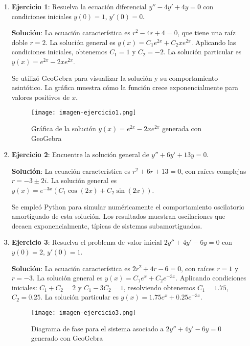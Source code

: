 \documentclass[12pt,a4paper]{article}
\begin{document}
\begin{enumerate}
    \item \textbf{Ejercicio 1}: Resuelva la ecuación diferencial $y'' - 4y' + 4y = 0$ con condiciones iniciales $y(0) = 1$, $y'(0) = 0$.
    
    \textbf{Solución}: La ecuación característica es $r^2 - 4r + 4 = 0$, que tiene una raíz doble $r = 2$. La solución general es $y(x) = C_1 e^{2x} + C_2 x e^{2x}$. Aplicando las condiciones iniciales, obtenemos $C_1 = 1$ y $C_2 = -2$. La solución particular es $y(x) = e^{2x} - 2x e^{2x}$.
    
    Se utilizó GeoGebra para visualizar la solución y su comportamiento asintótico. La gráfica muestra cómo la función crece exponencialmente para valores positivos de $x$.
    
    \begin{figure}[h]
        \centering
        \texttt{[image: imagen-ejercicio1.png]}
        \caption{Gráfica de la solución $y(x) = e^{2x} - 2x e^{2x}$ generada con GeoGebra}
        \label{fig:ej1}
    \end{figure}
    
    \item \textbf{Ejercicio 2}: Encuentre la solución general de $y'' + 6y' + 13y = 0$.
    
    \textbf{Solución}: La ecuación característica es $r^2 + 6r + 13 = 0$, con raíces complejas $r = -3 \pm 2i$. La solución general es $y(x) = e^{-3x}(C_1 \cos(2x) + C_2 \sin(2x))$.
    
    Se empleó Python para simular numéricamente el comportamiento oscilatorio amortiguado de esta solución. Los resultados muestran oscilaciones que decaen exponencialmente, típicas de sistemas subamortiguados.
    
    \item \textbf{Ejercicio 3}: Resuelva el problema de valor inicial $2y'' + 4y' - 6y = 0$ con $y(0) = 2$, $y'(0) = 1$.
    
    \textbf{Solución}: La ecuación característica es $2r^2 + 4r - 6 = 0$, con raíces $r = 1$ y $r = -3$. La solución general es $y(x) = C_1 e^{x} + C_2 e^{-3x}$. Aplicando condiciones iniciales: $C_1 + C_2 = 2$ y $C_1 - 3C_2 = 1$, resolviendo obtenemos $C_1 = 1.75$, $C_2 = 0.25$. La solución particular es $y(x) = 1.75e^{x} + 0.25e^{-3x}$.
    
    \begin{figure}[h]
        \centering
        \texttt{[image: imagen-ejercicio3.png]}
        \caption{Diagrama de fase para el sistema asociado a $2y'' + 4y' - 6y = 0$ generado con GeoGebra}
        \label{fig:ej3}
    \end{figure}
    

\end{enumerate}
\end{document}
